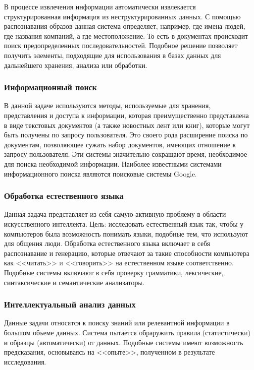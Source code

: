 \documentclass[14pt]{matmex-diploma-custom}
\begin{document}
В процессе извлечения информации автоматически извлекается структурированная информация из неструктурированных данных. С помощью распознавания образов данная система определяет, например, где имена людей, где названия компаний, а где местоположение. То есть в документах происходит поиск предопределенных последовательностей. Подобное решение позволяет получить элементы, подходящие для использования в базах данных для дальнейшего хранения, анализа или обработки.

\subsubsection{Информационный поиск}

В данной задаче используются методы, используемые для хранения, представления и доступа к информации, которая преимущественно представлена в виде текстовых документов (а также новостных лент или книг), которые могут быть получены по запросу пользователя. Это своего рода расширение поиска по документам, позволяющее сужать набор документов, имеющих отношение к запросу пользователя. Эти системы значительно сокращают время, необходимое для поиска необходимой информации. Наиболее известными системами информационного поиска являются поисковые системы Google.

\subsubsection{Обработка естественного языка}

Данная задача представляет из себя самую активную проблему в области искусственного интеллекта. Цель: исследовать естественный язык так, чтобы у компьютеров была возможность понимать языки, подобные тем, что используют для общения люди. Обработка естественного языка включает в себя распознавание и генерацию, которые отвечают за такие способности компьютера как <<читать>> и <<говорить>> на естественном языке соответственно. Подобные системы включают в себя проверку грамматики, лексические, синтаксические и семантические анализаторы.

\subsubsection{Интеллектуальный анализ данных}

Данные задачи относятся к поиску знаний или релевантной информации в большом объеме данных. Система пытается обраружить правила (статистически) и образцы (автоматически) от данных. Подобные системы имеют возможность предсказания, основываясь на <<опыте>>, полученном в результате исследования.
\end{document}

